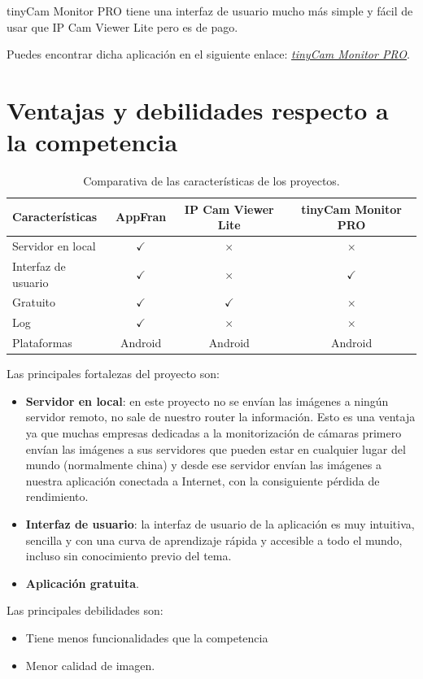 tinyCam Monitor PRO tiene una interfaz de usuario mucho más simple y fácil de usar que IP Cam Viewer Lite pero es de pago.

Puedes encontrar dicha aplicación en el siguiente enlace: \href{https://play.google.com/store/apps/details?id=com.alexvas.dvr.pro&hl=es&gl=US}{\textit{tinyCam Monitor PRO}}.



\section{Ventajas y debilidades respecto a la competencia}


\begin{table}[h!]
\centering
\begin{tabular}{lccc}
\toprule
Características                 & AppFran     & IP Cam Viewer Lite & tinyCam Monitor PRO   \\
\midrule
Servidor en local               & \cellcolor{green!25} {$\checkmark$} & \cellcolor{red!25} {$\times$}  & \cellcolor{red!25} {$\times$}  \\
Interfaz de usuario             & \cellcolor{green!25} {$\checkmark$} & \cellcolor{red!25} {$\times$}  & \cellcolor{green!25} {$\checkmark$}  \\
Gratuito                        & \cellcolor{green!25} {$\checkmark$} & \cellcolor{green!25} {$\checkmark$}  & \cellcolor{red!25} {$\times$}  \\
Log                        & \cellcolor{green!25} {$\checkmark$} & \cellcolor{red!25} {$\times$}  & \cellcolor{red!25} {$\times$}  \\
Plataformas                     & Android    & Android     & Android     \\
\bottomrule
\end{tabular}
\caption{Comparativa de las características de los proyectos.}
\label{comparativa-proyectos}
\end{table}

Las principales fortalezas del proyecto son:

\begin{itemize}
\tightlist
\item
  \textbf{Servidor en local}: en este proyecto no se envían las imágenes a ningún servidor remoto, no sale de nuestro router la información. Esto es una ventaja ya que muchas empresas dedicadas a la monitorización de cámaras primero envían las imágenes a sus servidores que pueden estar en cualquier lugar del mundo (normalmente china) y desde ese servidor envían las imágenes a nuestra aplicación conectada a Internet, con la consiguiente pérdida de rendimiento.
\item
  \textbf{Interfaz de usuario}: la interfaz de usuario de la aplicación es muy intuitiva, sencilla y con una curva de aprendizaje rápida y accesible a todo el mundo, incluso sin conocimiento previo del tema.
\item
  \textbf{Aplicación gratuita}.
\end{itemize}

Las principales debilidades son:

\begin{itemize}
\tightlist
\item
  Tiene menos funcionalidades que la competencia
\item
  Menor calidad de imagen.
\end{itemize}





